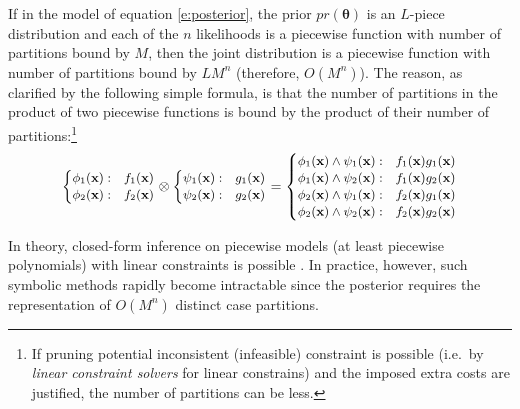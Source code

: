 


If in the model of equation \ref{e:posterior}, the prior $pr(\boldsymbol\theta)$ 
is an $L$-piece distribution and each of the $n$ likelihoods is a piecewise function with number of partitions  bound by $M$, 
then the joint distribution is a piecewise function with number of partitions bound by $LM^n$ (therefore, $O(M^n)$).
The reason, as clarified by the following simple formula,   
is that the number of partitions in the product of two piecewise functions is bound by the product of their number of partitions:\footnote{
If pruning potential inconsistent (infeasible) constraint is possible
(i.e.\ by \emph{linear constraint solvers} for linear constrains) and the imposed extra costs are justified,
the number of partitions can be less.
}%
\[
{\footnotesize
\begin{cases}
\phi_1(\bvec{x}) : & f_1(\bvec{x})\\
\phi_2(\bvec{x}) : & f_2(\bvec{x})
\end{cases}
\otimes
\begin{cases}
\psi_1(\bvec{x}) : & g_1(\bvec{x})\\
\psi_2(\bvec{x}) : & g_2(\bvec{x})
\end{cases}
=
\begin{cases}
\phi_1(\bvec{x}) \wedge \psi_1(\bvec{x}) : & f_1(\bvec{x}) g_1(\bvec{x})\\
\phi_1(\bvec{x}) \wedge \psi_2(\bvec{x}) : & f_1(\bvec{x}) g_2(\bvec{x})\\
\phi_2(\bvec{x}) \wedge \psi_1(\bvec{x}) : & f_2(\bvec{x}) g_1(\bvec{x})\\
\phi_2(\bvec{x}) \wedge \psi_2(\bvec{x}) : & f_2(\bvec{x}) g_2(\bvec{x})
\end{cases}
}%
\]

In theory, closed-form inference on piecewise models (at least piecewise polynomials) with linear constraints is possible \cite{Sanner:12}.
In practice, however, such symbolic methods rapidly become intractable since the posterior requires
the representation of $O(M^n)$ distinct case partitions.
   
